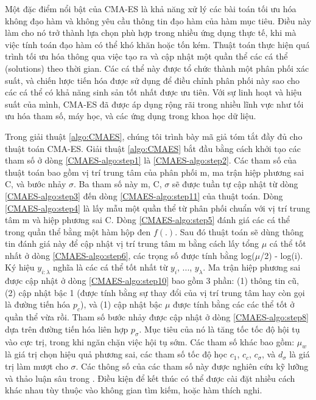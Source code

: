 Một đặc điểm nổi bật của CMA-ES là khả năng xử lý các bài toán tối ưu hóa không đạo hàm và không yêu cầu thông tin đạo hàm của hàm mục tiêu. Điều này làm cho nó trở thành lựa chọn phù hợp trong nhiều ứng dụng thực tế, khi mà việc tính toán đạo hàm có thể khó khăn hoặc tốn kém. Thuật toán thực hiện quá trình tối ưu hóa thông qua việc tạo ra và cập nhật một quần thể các cá thể (solutions) theo thời gian. Các cá thể này được tổ chức thành một phân phối xác suất, và chiến lược tiến hóa được sử dụng để điều chỉnh phân phối này sao cho các cá thể có khả năng sinh sản tốt nhất được ưu tiên. Với sự linh hoạt và hiệu suất của mình, CMA-ES đã được áp dụng rộng rãi trong nhiều lĩnh vực như tối ưu hóa tham số, máy học, và các ứng dụng trong khoa học dữ liệu.

Trong giải thuật \ref{algo:CMAES}, chúng tôi trình bày mã giả tóm tắt đầy đủ cho thuật toán CMA-ES. Giải thuật \ref{algo:CMAES} bắt đầu bằng cách khởi tạo các tham số ở dòng \ref{CMAES-algo:step1} là \ref{CMAES-algo:step2}. Các tham số của thuật toán bao gồm vị trí trung tâm của phân phối m, ma trận hiệp phương sai C, và bước nhảy $\sigma$. Ba tham số này {m, C, $\sigma$} sẽ được tuần tự cập nhật từ dòng \ref{CMAES-algo:step3} đến dòng \ref{CMAES-algo:step11} của thuật toán. Dòng \ref{CMAES-algo:step4} là lấy mẫu một quần thể  từ phân phối chuẩn với vị trí trung tâm m và hiệp phương sai C. Dòng \ref{CMAES-algo:step5} đánh giá các cá thể trong quần thể bằng một hàm hộp đen $f(.)$. Sau đó thuật toán sẽ dùng thông tin đánh giá này để cập nhật vị trí trung tâm m bằng cách lấy tổng $\mu$ cá thể tốt nhất ở dòng \ref{CMAES-algo:step6}, các trọng số được tính bằng log($\mu$/2) - log(i). Ký hiệu $y_{i:\lambda}$ nghĩa là các cá thể tốt nhất từ $y_i$, ..., $y_\lambda$. Ma trận hiệp phương sai được cập nhật ở dòng \ref{CMAES-algo:step10} bao gồm 3 phần: (1) thông tin cũ, (2) cập nhật bậc 1 (được tính bằng sự thay đổi của vị trí trung tâm hay còn gọi là đường tiến hóa $p_c$), và (1) cập nhật bậc $\mu$ được tính bằng các các thể tốt ở quần thể vừa rồi. Tham số bước nhảy được cập nhật ở dòng \ref{CMAES-algo:step8} dựa trên đường tiến hóa liên hợp $p_\sigma$. Mục tiêu của nó là tăng tốc tốc độ hội tụ vào cực trị, trong khi ngăn chặn việc hội tụ sớm. Các tham số khác bao gồm: $\mu_w$ là giá trị chọn hiệu quả phương sai, các tham số tốc độ học $c_1$, $c_c$, $c_\sigma$, và $d_\sigma$ là giá trị làm mượt cho $\sigma$. Các thông số của các tham số này được nghiên cứu kỹ lưỡng và thảo luận sâu trong \cite{hansen2023cma}. Điều kiện để kết thúc có thể được cài đặt nhiều cách khác nhau tùy thuộc vào không gian tìm kiếm, hoặc hàm thích nghi.

